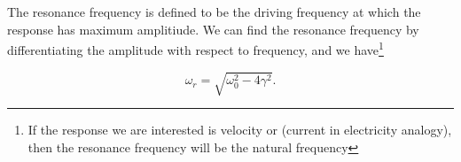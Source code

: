 \documentclass[english,a4paper,12pt]{report}
\begin{document}
{The resonance frequency is defined to be the driving frequency at which the response has maximum amplitiude. We can find the resonance frequency by differentiating the amplitude with respect to frequency, and we have\footnote{If the response we are interested is velocity or (current in electricity analogy), then the resonance frequency will be the natural frequency}

\begin{equation}
    \omega _{r} = \sqrt{\omega _{0}^2 - 4\gamma ^2 }.
\end{equation}

} 
\end{document}
